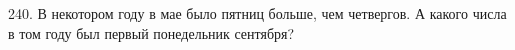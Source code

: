 240. В некотором году в мае было пятниц больше, чем четвергов. А какого числа в том году был первый понедельник сентября?\\
